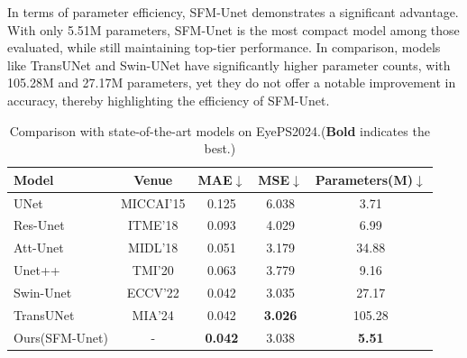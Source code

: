 \documentclass[AMA,Times1COL]{WileyNJDv5} %
\begin{document}
In terms of parameter efficiency, SFM-Unet demonstrates a significant advantage. With only 5.51M parameters, SFM-Unet is the most compact model among those evaluated, while still maintaining top-tier performance. In comparison, models like TransUNet and Swin-UNet have significantly higher parameter counts, with 105.28M and 27.17M parameters, yet they do not offer a notable improvement in accuracy, thereby highlighting the efficiency of SFM-Unet.

\begin{table}[htbp]
\scriptsize
\centering
\caption{Comparison with state-of-the-art models on EyePS2024.(\textbf{Bold} indicates the best.)}
\begin{tabular}{lcccc}
\toprule
\textbf{Model} & \textbf{Venue} & \textbf{MAE$\downarrow$} & \textbf{MSE$\downarrow$}  & \textbf{Parameters(M)$\downarrow$}\\
\midrule
UNet\cite{ronneberger2015u}  & MICCAI'15   & 0.125  & 6.038 & 3.71 \\
Res-Unet\cite{xiao2018weighted} & ITME'18 & 0.093  & 4.029 & 6.99 \\
Att-Unet\cite{oktay2018attention} & MIDL'18 & 0.051  & 3.179 & 34.88 \\
Unet++\cite{zhou2019unet++} & TMI'20 & 0.063  & 3.779 & 9.16 \\
Swin-Unet\cite{cao2022swin} & ECCV'22 & 0.042  & 3.035 & 27.17 \\
TransUNet\cite{chen2024transunet} & MIA'24 & 0.042  & \textbf{3.026} & 105.28 \\
Ours(SFM-Unet) & - & \textbf{0.042}  & 3.038 & \textbf{5.51} \\
\bottomrule
\end{tabular}
\label{tab:mae_mse_comparison}
\end{table}

\end{document}
